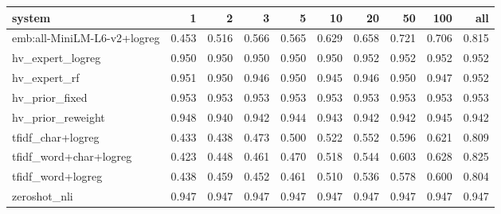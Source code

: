 \begin{tabular}{lrrrrrrrrr}
\toprule
system & 1 & 2 & 3 & 5 & 10 & 20 & 50 & 100 & all \\
\midrule
emb:all-MiniLM-L6-v2+logreg & 0.453 & 0.516 & 0.566 & 0.565 & 0.629 & 0.658 & 0.721 & 0.706 & 0.815 \\
hv\_expert\_logreg & 0.950 & 0.950 & 0.950 & 0.950 & 0.950 & 0.952 & 0.952 & 0.952 & 0.952 \\
hv\_expert\_rf & 0.951 & 0.950 & 0.946 & 0.950 & 0.945 & 0.946 & 0.950 & 0.947 & 0.952 \\
hv\_prior\_fixed & 0.953 & 0.953 & 0.953 & 0.953 & 0.953 & 0.953 & 0.953 & 0.953 & 0.953 \\
hv\_prior\_reweight & 0.948 & 0.940 & 0.942 & 0.944 & 0.943 & 0.942 & 0.942 & 0.945 & 0.942 \\
tfidf\_char+logreg & 0.433 & 0.438 & 0.473 & 0.500 & 0.522 & 0.552 & 0.596 & 0.621 & 0.809 \\
tfidf\_word+char+logreg & 0.423 & 0.448 & 0.461 & 0.470 & 0.518 & 0.544 & 0.603 & 0.628 & 0.825 \\
tfidf\_word+logreg & 0.438 & 0.459 & 0.452 & 0.461 & 0.510 & 0.536 & 0.578 & 0.600 & 0.804 \\
zeroshot\_nli & 0.947 & 0.947 & 0.947 & 0.947 & 0.947 & 0.947 & 0.947 & 0.947 & 0.947 \\
\bottomrule
\end{tabular}
